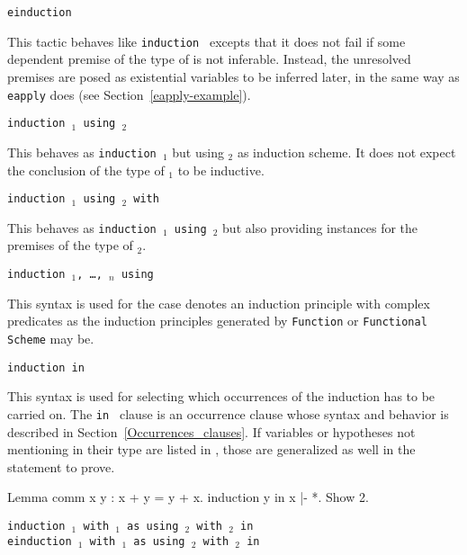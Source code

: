 \begin{coq_example*}
\begin{Variants}
\item{\tt einduction {\term}}

  This tactic behaves like \texttt{induction {\term}} excepts that it
  does not fail if some dependent premise of the type of {\term} is
  not inferable. Instead, the unresolved premises are posed as
  existential variables to be inferred later, in the same way as {\tt
  eapply} does (see Section~\ref{eapply-example}).

\item {\tt induction {\term$_1$} using {\term$_2$}}

  This behaves as {\tt induction {\term$_1$}} but using {\term$_2$} as
  induction scheme. It does not expect the conclusion of the type of
  {\term$_1$} to be inductive.

\item {\tt induction {\term$_1$} using {\term$_2$} with {\bindinglist}}

  This behaves as {\tt induction {\term$_1$} using {\term$_2$}} but
  also providing instances for the premises of the type of {\term$_2$}.

\item \texttt{induction {\term}$_1$, {\ldots}, {\term}$_n$ using {\qualid}}

  This syntax is used for the case {\qualid} denotes an induction principle
  with complex predicates as the induction principles generated by
  {\tt Function} or {\tt Functional Scheme} may be.

\item \texttt{induction {\term} in {\occgoalset}}

  This syntax is used for selecting which occurrences of {\term} the
  induction has to be carried on. The {\tt in \occgoalset} clause is
  an occurrence clause whose syntax and behavior is described in
  Section~\ref{Occurrences_clauses}. If variables or hypotheses not
  mentioning {\term} in their type are listed in {\occgoalset}, those
  are generalized as well in the statement to prove.

\Example

\begin{coq_example}
Lemma comm x y : x + y = y + x.
induction y in x |- *.
Show 2.
\end{coq_example}

\item {\tt induction {\term$_1$} with {\bindinglist$_1$}
       as {\disjconjintropattern} %
       using {\term$_2$} with {\bindinglist$_2$} in {\occgoalset}}\\
     {\tt einduction {\term$_1$} with {\bindinglist$_1$}
       as {\disjconjintropattern} %
       using {\term$_2$} with {\bindinglist$_2$} in {\occgoalset}}


\end{Variants}
\end{coq_example*}
